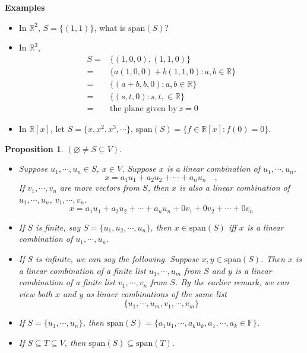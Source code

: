 \documentclass[12pt]{article}
\newtheorem{proposition}{Proposition}[subsection]
\newcommand{\Span}{\mathrm{span}}
\let\emptyset\varnothing
\begin{document}
	{\color{Brown}
		\textbf{Examples}
		\begin{itemize}
			\item In $\mathbb{R}^2$, $S = \{(1,1)\}$, what is $\Span(S)$?
			
			\item In $\mathbb{R}^3$, 
				\begin{align*}
					S =& \{(1,0,0), (1,1,0)\} \\
					=& \{a(1,0,0)+b(1,1,0): a,b \in \mathbb{R}\} \\
					=&\{(a+b, b ,0):a,b\in\mathbb{R}\} \\
					=&\{(s,t,0):s,t,\in \mathbb{R}\} \\
					=& \text{the plane given by} \ z = 0 
				\end{align*}
				
			\item In $\mathbb{R}[x]$, let $S = \{x,x^2,x^3,\cdots\}$,
				$\Span(S) = \{f\in\mathbb{R}[x]: f(0)=0\}$.\\
		\end{itemize}
	}
	
	\begin{proposition}
		$(\emptyset \neq S\subseteq V)$. 
		\begin{itemize}
			\item Suppose $u_1,\cdots,u_n \in S$, $x\in V$. 
				Suppose $x$ is a linear combination of $u_1,\cdots, u_n$.
				\[
					x = a_1u_1 + a_2u_2 + \cdots + a_nu_n \quad , 
				\]
				If $v_1,\cdots, v_n$ are more vectors from $S$, 
				then $x$ is also a linear combination of 
				$u_1,\cdots,u_n$, $v_1,\cdots, v_n$.
				\[
					x = a_1u_1 + a_2u_2 + \cdots + a_nu_n + 0 v_1+ 0 v_2+
					\cdots + 0v_n
				\]

			\item 
				If $S$ is finite, say $S = \{u_1, u_2, \cdots, u_n\}$, then
				$x \in \Span(S)$ iff $x$ is a linear combination of $u_1, 
				\cdots, u_n$. 

			\item 
				If $S$ is infinite, we can say the following. 
				Suppose $x, y \in \Span(S)$. Then $x$ is a linear combination
				of a finite list $u_1, \cdots, u_m$ from $S$ and $y$ is a 
				linear combination of a finite list $v_1, \cdots, v_n$ from 
				$S$. By the earlier remark, we can view both $x$ and $y$ as
				linaer combinations of the same list
				\[
					\{u_1, \cdots, u_m, v_1, \cdots, v_m\}
				\]

			\item If $S = \{u_1, \cdots, u_n\}$, then 
				$\Span(S) = \{a_1u_1,\cdots, a_ku_k, 
				a_1,\cdots, a_k\in\mathbb{F}\}$.

			\item If $S \subseteq T \subseteq V$, then
				$\Span(S) \subseteq \Span(T)$. 
		\end{itemize}
	\end{proposition}
\end{document}
